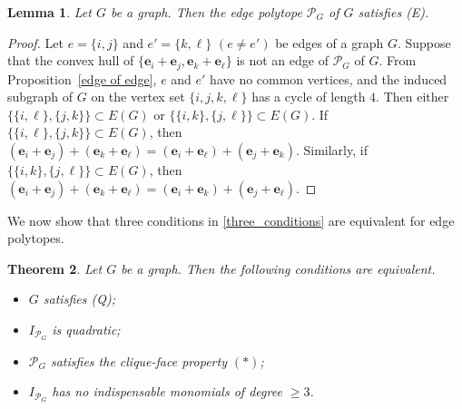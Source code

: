 \documentclass[10pt,a4paper]{amsart}
\newtheorem{thm}{Theorem} [section]
\newtheorem{lemma}[thm]{Lemma}
\numberwithin{thm}{section}
\numberwithin{equation}{section}
\def\epoly{{\mathcal P}_G}
\def\eb{{\mathbf e}}
\begin{document}
\begin{lemma}\label{edgepolyE}
    Let $G$ be a graph. Then the edge polytope $\epoly$ of $G$ satisfies (E).
\end{lemma}

\begin{proof}
 Let $e = \{i,j\}$ and $e'=\{k,\ell\}$ $(e \ne e')$ be edges of a graph $G$.
Suppose that the convex hull of  $\{\eb_i+\eb_j, \eb_k+\eb_\ell\}$ is not an edge of  $\epoly$ of $G$.
From Proposition~\ref{edge of edge}, 
    $e$ and $e'$ have no common vertices, and the induced subgraph of $G$ on the vertex set $\{i,j,k,\ell\}$ has a cycle of length $4$.
Then either $\{\{i,\ell\}, \{j,k\}\} \subset E(G)$ or $\{\{i,k\}, \{j,\ell\}\} \subset E(G)$.
If $\{\{i,\ell\}, \{j,k\}\} \subset E(G)$, then $(\eb_i+\eb_j) + (\eb_k+\eb_\ell) = (\eb_i+\eb_\ell) + (\eb_j+\eb_k)$.
Similarly, if $\{\{i,k\}, \{j,\ell\}\}  \subset E(G)$, then $(\eb_i+\eb_j) + (\eb_k+\eb_\ell) = (\eb_i+\eb_k) + (\eb_j+\eb_\ell)$.
\end{proof}

We now show that three conditions in \eqref{three_conditions} are equivalent for edge polytopes.


\begin{thm}\label{edge_equivalent}
    Let $G$ be a graph.
    Then the following conditions are equivalent.
    \begin{itemize}
        \item[{\rm (i)}] 
        $G$ satisfies (Q){\rm ;}
    
        \item[{\rm (ii)}] 
        $I_{\epoly}$ is quadratic{\rm ;}

        \item[{\rm (iii)}] 
        $\epoly$ satisfies the clique-face property $(*)${\rm ;}
        \item[{\rm (iv)}] 
        $I_{\epoly}$ has no indispensable monomials of degree $\ge 3$.

    \end{itemize}
\end{thm}
\end{document}
